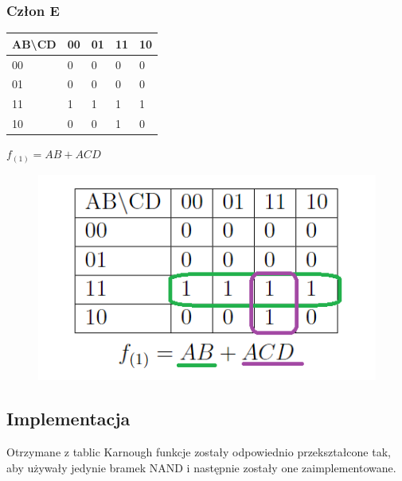 \documentclass[a4paper]{article}
\begin{document}
\subsubsection{Człon E}
\begin{center}
\begin{tabular}{|l|l|l|l|l|}
  \hline
  AB\textbackslash{}CD & 00 & 01 & 11 & 10 \\ \hline
  00                   & 0  & 0  & 0  & 0  \\ \hline
  01                   & 0  & 0  & 0  & 0  \\ \hline
  11                   & 1  & 1  & 1  & 1  \\ \hline
  10                   & 0  & 0  & 1  & 0  \\ \hline
  \end{tabular}
\end{center}
  \begin{center}
  $f_{(1)} = AB + ACD$
\end{center}

\begin{figure}[H]
  \centering
  \includegraphics{tab_E.png}
 \end{figure}

\subsection{Implementacja}
Otrzymane z tablic Karnough funkcje zostały odpowiednio przekształcone tak,
 aby używały jedynie bramek NAND i następnie zostały one zaimplementowane.
\end{document}
